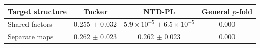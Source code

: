 \begin{tabular}{@{}l c c c@{}}
\toprule
Target structure & Tucker & NTD-PL & General $p$-fold \\
\midrule
Shared factors & 0.255 $\pm$ 0.032 & $5.9\times10^{-5} \pm 6.5\times10^{-5}$ & 0.000\\
Separate maps & 0.262 $\pm$ 0.023 & 0.262 $\pm$ 0.023 & 0.000\\
\bottomrule
\end{tabular}
